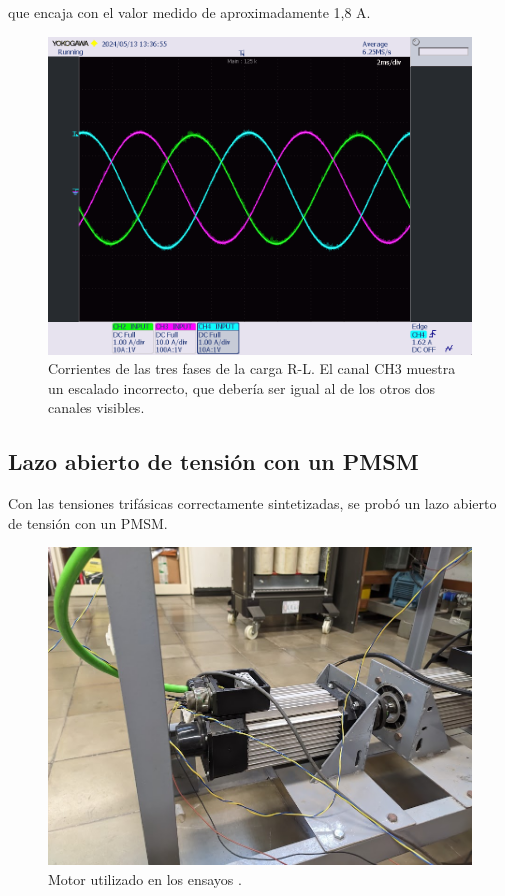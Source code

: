 que encaja con el valor medido de aproximadamente 1,8 A.


\begin{figure}[H]
	\centering
	\includegraphics[width=0.7\linewidth]{fig/3RLcurrent}
	\caption{Corrientes de las tres fases de la carga R-L. El canal CH3 muestra un escalado incorrecto, que debería ser igual al de los otros dos canales visibles.}
\end{figure}

\subsection{Lazo abierto de tensión con un PMSM}

Con las tensiones trifásicas correctamente sintetizadas, se probó un lazo abierto de tensión con un PMSM.

\begin{figure}[H]
	\centering
	\includegraphics[width=0.7\linewidth]{fig/motorLab}
	\caption{Motor utilizado en los ensayos \cite{mavilor2018}.}
\end{figure}


